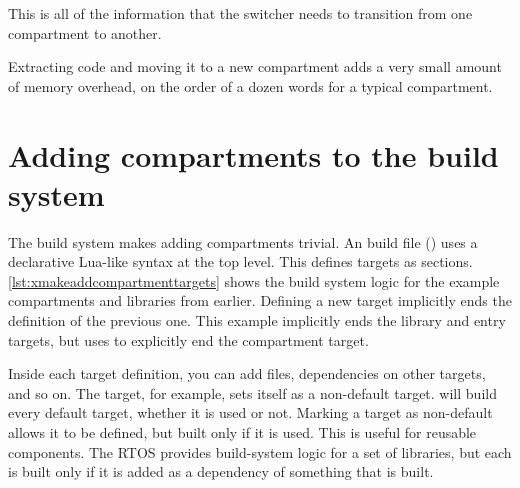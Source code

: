 This is all of the information that the switcher needs to transition from one compartment to another.

Extracting code and moving it to a new compartment adds a very small amount of memory overhead, on the order of a dozen words for a typical compartment.

\section{Adding compartments to the build system}

The build system makes adding compartments trivial.
An  build file () uses a declarative Lua-like syntax at the top level.
This defines targets as sections.
\ref{lst:xmakeaddcompartmenttargets} shows the build system logic for the example compartments and libraries from earlier.
Defining a new target implicitly ends the definition of the previous one.
This example implicitly ends the library and entry targets, but uses  to explicitly end the compartment target.

\lualisting[filename=examples/library_or_compartment/xmake.lua,marker=compartments_and_libraries,label=lst:xmakeaddcompartmenttargets,caption="Build system code for defining compartment and library targets"]{}

Inside each target definition, you can add files, dependencies on other targets, and so on.
The  target, for example, sets itself as a non-default target.
 will build every default target, whether it is used or not.
Marking a target as non-default allows it to be defined, but built only if it is used.
This is useful for reusable components.
The RTOS provides build-system logic for a set of libraries, but each is built only if it is added as a dependency of something that is built.



